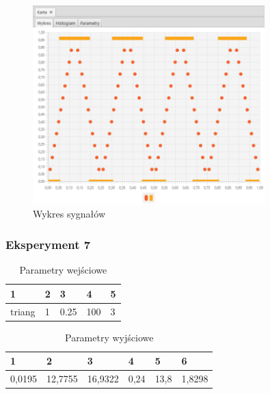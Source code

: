 \documentclass[12pt]{article}
\begin{document}
{{{                \begin{figure}[H]
                    \centering
                    \includegraphics[width=0.8\textwidth]{img/result/experiment5/06/data_draw_sampling_output_quant_output_202217.png}
                    \caption{Wykres sygnałów}
                \end{figure}
            }
            \newpage

            \subsubsection{Eksperyment 7} {
                \begin{table}[H]
                    \centering
                    \begin{tabular}{|l|l|l|l|l|}
                        \hline
                        1 & 2 & 3 & 4 & 5   \\ \hline
                        triang & 1 & 0.25 & 100 & 3   \\ \hline
                    \end{tabular}
                    \caption{Parametry wejściowe}
                \end{table}

                \begin{table}[H]
                    \centering
                    \begin{tabular}{|l|l|l|l|l|l|}
                        \hline
                        1 & 2 & 3 & 4 & 5 & 6  \\ \hline
                        0,0195 & 12,7755 & 16,9322 & 0,24 & 13,8 & 1,8298 \\ \hline
                    \end{tabular}
                    \caption{Parametry wyjściowe}
                \end{table}


}}}
\end{document}
